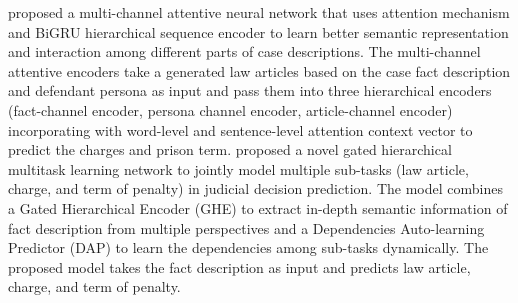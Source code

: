 \documentclass[sn-mathphys,Numbered]{sn-jnl}%
\theoremstyle{thmstyleone}%
\theoremstyle{thmstyletwo}%
\theoremstyle{thmstylethree}%
\begin{document}
\citet{li2019mann} proposed a multi-channel attentive neural network that uses attention mechanism and BiGRU hierarchical sequence encoder to learn better semantic representation and interaction among different parts of case descriptions. %
The multi-channel attentive encoders take a generated law articles based on the case fact description and defendant persona as input and pass them into three hierarchical encoders (fact-channel encoder, persona channel encoder, article-channel encoder) incorporating with word-level and sentence-level attention context vector to predict the charges and prison term. %
\citet{yao2020gated} proposed a novel gated hierarchical multitask learning network to jointly model multiple sub-tasks (law article, charge, and term of penalty) in judicial decision prediction. The model combines a Gated Hierarchical Encoder (GHE) to extract in-depth semantic information of fact description from multiple perspectives and a Dependencies Auto-learning Predictor (DAP) to learn the dependencies among sub-tasks dynamically. The proposed model takes the fact description as input and predicts law article, charge, and term of penalty. %


\end{document}
